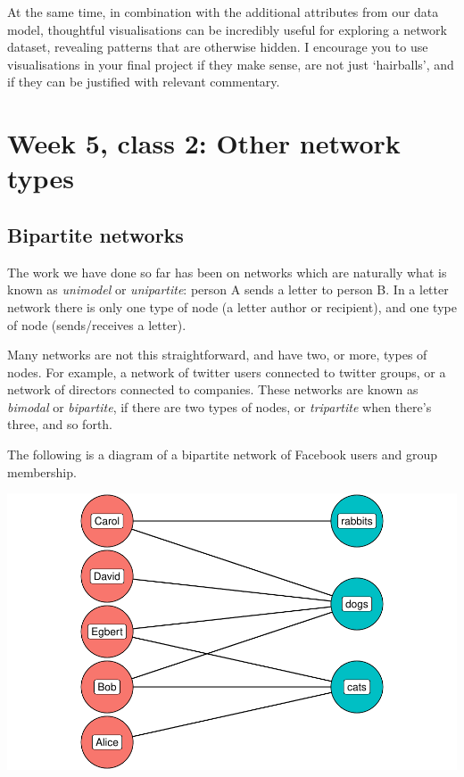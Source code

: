 \documentclass[
]{book}
\begin{document}
At the same time, in combination with the additional attributes from our data model, thoughtful visualisations can be incredibly useful for exploring a network dataset, revealing patterns that are otherwise hidden. I encourage you to use visualisations in your final project if they make sense, are not just `hairballs', and if they can be justified with relevant commentary.

\hypertarget{week-5-class-2-other-network-types}{%
\chapter{Week 5, class 2: Other network types}\label{week-5-class-2-other-network-types}}

\hypertarget{bipartite-networks-1}{%
\section{Bipartite networks}\label{bipartite-networks-1}}

The work we have done so far has been on networks which are naturally what is known as \emph{unimodel} or \emph{unipartite}: person A sends a letter to person B. In a letter network there is only one type of node (a letter author or recipient), and one type of node (sends/receives a letter).

Many networks are not this straightforward, and have two, or more, types of nodes. For example, a network of twitter users connected to twitter groups, or a network of directors connected to companies. These networks are known as \emph{bimodal} or \emph{bipartite}, if there are two types of nodes, or \emph{tripartite} when there's three, and so forth.

The following is a diagram of a bipartite network of Facebook users and group membership.

\includegraphics{_main_files/figure-latex/unnamed-chunk-69-1.pdf}
\end{document}
